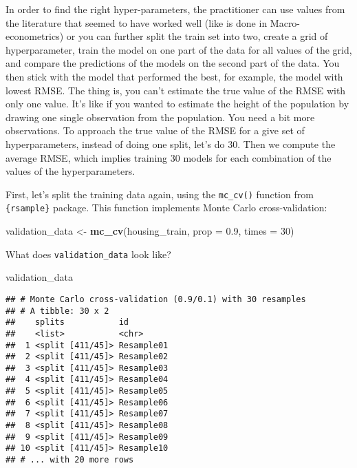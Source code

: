 \documentclass[
]{article}
\newenvironment{Shaded}{\begin{snugshade}}{\end{snugshade}}
\newcommand{\DataTypeTok}[1]{\textcolor[rgb]{0.13,0.29,0.53}{#1}}
\newcommand{\DecValTok}[1]{\textcolor[rgb]{0.00,0.00,0.81}{#1}}
\newcommand{\FloatTok}[1]{\textcolor[rgb]{0.00,0.00,0.81}{#1}}
\newcommand{\KeywordTok}[1]{\textcolor[rgb]{0.13,0.29,0.53}{\textbf{#1}}}
\newcommand{\NormalTok}[1]{#1}
\newcommand{\StringTok}[1]{\textcolor[rgb]{0.31,0.60,0.02}{#1}}
\begin{document}
In order to find the right hyper-parameters, the practitioner can
use values from the literature that seemed to have worked well (like is done in Macro-econometrics)
or you can further split the train set into two, create a grid of hyperparameter, train the model
on one part of the data for all values of the grid, and compare the predictions of the models on the
second part of the data. You then stick with the model that performed the best, for example, the
model with lowest RMSE. The thing is, you can't estimate the true value of the RMSE with only
one value. It's like if you wanted to estimate the height of the population by drawing one single
observation from the population. You need a bit more observations. To approach the true value of the
RMSE for a give set of hyperparameters, instead of doing one split, let's do 30. Then we
compute the average RMSE, which implies training 30 models for each combination of the values of the
hyperparameters.

First, let's split the training data again, using the \texttt{mc\_cv()} function from \texttt{\{rsample\}} package.
This function implements Monte Carlo cross-validation:

\begin{Shaded}
\begin{Highlighting}[]
\NormalTok{validation\_data \textless{}{-}}\StringTok{ }\KeywordTok{mc\_cv}\NormalTok{(housing\_train, }\DataTypeTok{prop =} \FloatTok{0.9}\NormalTok{, }\DataTypeTok{times =} \DecValTok{30}\NormalTok{)}
\end{Highlighting}
\end{Shaded}

What does \texttt{validation\_data} look like?

\begin{Shaded}
\begin{Highlighting}[]
\NormalTok{validation\_data}
\end{Highlighting}
\end{Shaded}

\begin{verbatim}
## # Monte Carlo cross-validation (0.9/0.1) with 30 resamples  
## # A tibble: 30 x 2
##    splits           id        
##    <list>           <chr>     
##  1 <split [411/45]> Resample01
##  2 <split [411/45]> Resample02
##  3 <split [411/45]> Resample03
##  4 <split [411/45]> Resample04
##  5 <split [411/45]> Resample05
##  6 <split [411/45]> Resample06
##  7 <split [411/45]> Resample07
##  8 <split [411/45]> Resample08
##  9 <split [411/45]> Resample09
## 10 <split [411/45]> Resample10
## # ... with 20 more rows
\end{verbatim}
\end{document}

